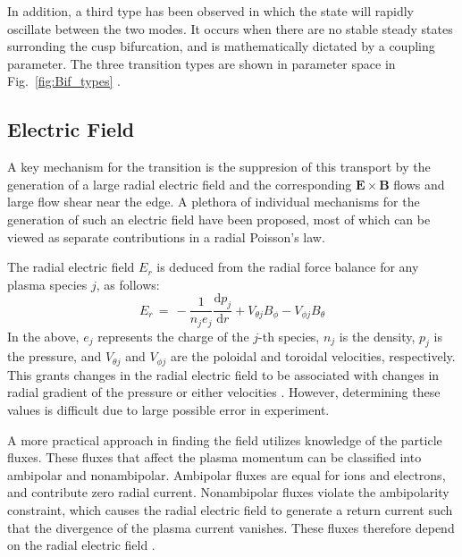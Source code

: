 \documentclass[a4paper]{article}
\begin{document}
In addition, a third type has been observed in which the state will rapidly oscillate between the two modes.
It occurs when there are no stable steady states surronding the cusp bifurcation, and is mathematically dictated by a coupling parameter.
The three transition types are shown in parameter space in Fig.~\ref{fig:Bif_types}
\cite{weymiens_bifurcation_2014}.


\subsection{Electric Field}
A key mechanism for the transition is the suppresion of this transport by the generation of a large radial electric field and the corresponding $\mathbf{E}\times\mathbf{B}$ flows and large flow shear near the edge.
A plethora of individual mechanisms for the generation of such an electric field have been proposed, most of which can be viewed as separate contributions in a radial Poisson's law.

The radial electric field $E_r$ is deduced from the radial force balance for any plasma species $j$, as follows:
\begin{equation}
	E_r \,=\, -\frac{1}{n_j e_j} \frac{\text{d} p_j}{\text{d} r} + V_{\theta j} B_\phi - V_{\phi j} B_\theta
	\label{eq:E_r}
\end{equation}
In the above, $e_j$ represents the charge of the $j$-th species, $n_j$ is the density, $p_j$ is the pressure, and $V_{\theta j}$ and $V_{\phi j}$ are the poloidal and toroidal velocities, respectively.
This grants changes in the radial electric field to be associated with changes in radial gradient of the pressure or either velocities \cite{connor_review_2000}\cite{staps_backstepping_2017}.
However, determining these values is difficult due to large possible error in experiment.

A more practical approach in finding the field utilizes knowledge of the particle fluxes.
These fluxes that affect the plasma momentum can be classified into ambipolar and nonambipolar.
Ambipolar fluxes are equal for ions and electrons, and contribute zero radial current.
Nonambipolar fluxes violate the ambipolarity constraint, which causes the radial electric field to generate a return current such that the divergence of the plasma current vanishes.
These fluxes therefore depend on the radial electric field \cite{callen_toroidal_2009}.
\end{document}
